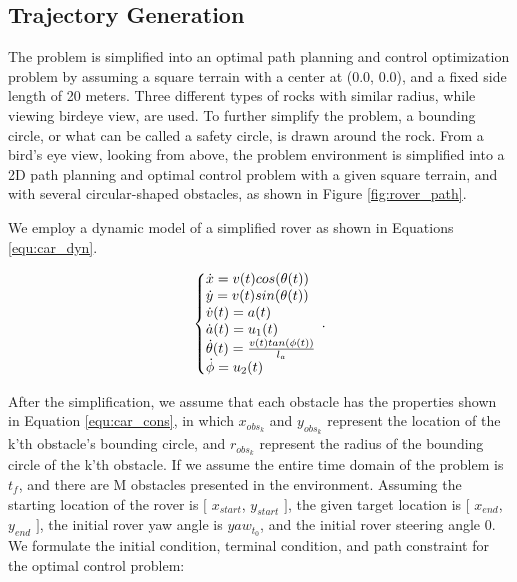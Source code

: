 \documentclass{article}
\begin{document}
\subsection{Trajectory Generation}

The problem is simplified into an optimal path planning and control optimization problem by assuming a square terrain with a center at (0.0, 0.0), and a fixed side length of 20 meters. Three different types of rocks with similar radius, while viewing birdeye view, are used. To further simplify the problem, a bounding circle, or what can be called a safety circle, is drawn around the rock. From a bird's eye view, looking from above, the problem environment is simplified into a 2D path planning and optimal control problem with a given square terrain, and with several circular-shaped obstacles, as shown in Figure \ref{fig:rover_path}.

We employ a dynamic model of a simplified rover as shown in Equations \ref{equ:car_dyn}.

\begin{equation}
\label{equ:car_dyn}
  \left\{\begin{array}{@{}l@{}}
    \dot{x}=v(t)cos(\theta(t))  \\
    \dot{y}=v(t)sin(\theta(t))  \\
    \dot{v}(t) = a(t) \\
    \dot{a}(t) = u_{1}(t) \\
    \dot{\theta}(t) = \frac{v(t)tan(\phi(t))}{l_{a}} \\
    \dot{\phi}=u_{2}(t) \\
  \end{array}\right.\,.
\end{equation}

After the simplification, we assume that each obstacle has the properties shown in Equation \ref{equ:car_cons}, in which \(x_{obs_{k}}\) and \(y_{obs_{k}}\) represent the location of the k'th obstacle's bounding circle, and \(r_{obs_{k}}\) represent the radius of the bounding circle of the k'th obstacle. If we assume the entire time domain of the problem is $t_{f}$, and there are M obstacles presented in the environment. Assuming the starting location of the rover is \([\) \(x_{start}\), \(y_{start}\) \(]\), the given target location is \([\) \(x_{end}\), \(y_{end}\) \(]\), the initial rover yaw angle is $yaw_{t_{0}}$, and the initial rover steering angle $0$. We formulate the initial condition, terminal condition, and path constraint for the optimal control problem: 
\end{document}
